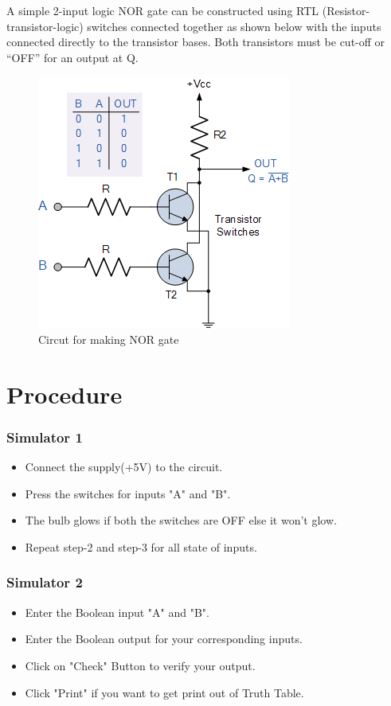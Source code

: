 	A simple 2-input logic NOR gate can be constructed using RTL (Resistor-transistor-logic) switches connected together as shown below with the inputs connected directly to the transistor bases. Both transistors must be cut-off or “OFF” for an output at Q.
	
	\begin{figure}[h]
		\centering
		\includegraphics{img/exp5/3}
		\caption{Circut for making NOR gate}
		\label{fig:5:3}
	\end{figure}
				
\section{Procedure}
	\subsubsection{Simulator 1}
	\begin{itemize}
		\tightlist
		\item Connect the supply(+5V) to the circuit.
		\item Press the switches for inputs "A" and "B".
		\item The bulb glows if both the switches are OFF else it won't glow.
		\item Repeat step-2 and step-3 for all state of inputs.
	\end{itemize}

	\subsubsection{Simulator 2}
	\begin{itemize}
		\tightlist
		\item Enter the Boolean input "A" and "B".
		\item Enter the Boolean output for your corresponding inputs.
		\item Click on "Check" Button to verify your output.
		\item Click "Print" if you want to get print out of Truth Table.
	\end{itemize}


